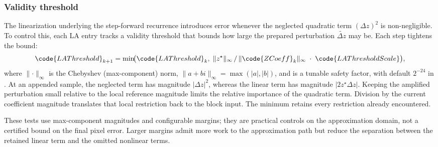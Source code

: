 \subsubsection{Validity threshold}
\label{sec:la-threshold}

The linearization underlying the step-forward recurrence introduces error
whenever the neglected quadratic term \((\Delta z)^2\) is non-negligible.
To control this, each LA entry tracks a validity threshold
 that bounds how large the prepared perturbation
\(\tilde{\Delta z}\) may be.  Each step tightens the bound:
\begin{equation}
\code{LAThreshold}_{k+1}
  = \min\!\bigl(
      \code{LAThreshold}_k,\;
      \lVert z^\star\rVert_\infty \,/\,
      \lVert\code{ZCoeff}_k\rVert_\infty
      \;\cdot\;\code{LAThresholdScale}
    \bigr),
\label{eq:la-threshold}
\end{equation}
where \(\lVert\cdot\rVert_\infty\) is the Chebyshev (max-component) norm,
\(\lVert a + bi \rVert_\infty = \max(|a|, |b|)\), and
 is a tunable safety factor, with default
$2^{-24}$ in . At an appended sample, the neglected
term has magnitude $|\Delta z|^2$, whereas the linear term has
magnitude $|2z^\star\Delta z|$. Keeping the amplified perturbation
small relative to the local reference magnitude limits the relative
importance of the quadratic term. Division by the current coefficient
magnitude translates that local restriction back to the block input.
The minimum retains every restriction already encountered.

These tests use max-component magnitudes and configurable margins;
they are practical controls on the approximation domain, not a
certified bound on the final pixel error. Larger margins admit more
work to the approximation path but reduce the separation between the
retained linear term and the omitted nonlinear terms.


